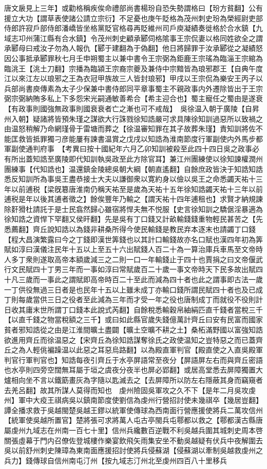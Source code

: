 唐文扆見上三年】或勸格稱疾俟命禮部尚書楊玢自恐失勢謂格曰【玢方貧翻】公有援立大功【謂草表使諸公請立宗衍】不足憂也庚午貶格為茂州刺史玢為榮經尉吏部侍郎許寂戶部侍郎潘嶠皆坐格黨貶官格尋再貶維州司戶庾凝績奏徙格於合水鎮【九域志卭州蒲江縣有合水鎮】令茂州刺史顧承郾伺格隂事王宗侃妻以格同姓欲全之謂承郾母曰戒汝子勿為人報仇【郾于建翻為于偽翻】他日將歸罪于汝承郾從之凝績怒因公事抵承郾罪秋七月壬申朔蜀主以兼中書令王宗弼為鉅鹿王宗瑤為臨淄王宗綰為臨洮王【洮土刀翻】宗播為臨潁王宗裔宗夔及兼侍中宗黯皆為琅邪郡王【自典午度江以來江左以琅邪之王為衣冠甲族故三人皆封琅邪】甲戌以王宗侃為樂安王丙子以兵部尚書庾傳素為太子少保兼中書侍郎同平章事蜀主不親政事内外遷除皆出于王宗弼宗弼納賄多私上下多怨宋光嗣通敏善希合【希主迎合也】蜀主寵任之蜀由是遂衰【有政事則國強無政事則國衰衰者亡之漸也可不戒哉】　吳徐温入朝于廣陵【自昇州入朝】疑諸將皆預朱瑾之謀欲大行誅戮徐知誥嚴可求具陳徐知訓過惡所以致禍之由温怒稍解乃命網瑾骨于雷塘而葬之【徐温審知罪在其子故葬朱瑾】責知訓將佐不能匡救皆抵罪獨刁彦能屢有諫書温賞之戊戌以知誥為淮南節度行軍副使内外馬步都軍副使通判府事　【考異曰按十國紀年六月乙卯知訓被殺至此四十四日吳之政事必有所出蓋知誥至廣陵即代知訓執吳政至此方除官耳】兼江州團練使以徐知諫權潤州團練事【代知誥也】温還鎮金陵總吳朝大綱【朝直遙翻】自餘庶政皆決于知誥知誥悉反知訓所為事吳王盡恭接士大夫以謙御衆以寛約身以儉以吳王之命悉蠲天祐十三年以前逋税【梁旣簒唐淮南仍稱天祐至是歲為天祐十五年徐知誥蠲天祐十三年以前逋税是年以後其逋者徵之】餘俟豐年乃輸之【謂天祐十四年逋租也】求賢才納規諫除姧猾杜請託于是士民翕然歸心雖宿將悍夫無不悦服【史言徐知訓之驕倨淫暴適為徐知誥之資悍下罕翻又侯旰翻】先是吳有丁口錢又計畝輸錢錢重物輕民甚苦之【先悉薦翻】齊丘說知誥以為錢非耕桑所得今使民輸錢是教民弃本逐末也請蠲丁口錢【程大昌演繁露曰今之丁錢即漢世筭錢也以其計口輸錢故亦名口賦也漢四年初為筭賦如淳曰漢儀注民年十五以上至五十六出賦錢人百二十為一算治庫兵車馬至文帝時人多丁衆則遂取高帝本額歲減三之二則一口一年輸錢止于四十也賈捐之曰文帝偃武行文民賦四十丁男三年而一事如淳曰常賦歲百二十歲一事文帝時天下民多故出賦四十凡三歲而一事此之謂賦即高帝時百二十至此而減為四十者也此之謂事即古法一歲一丁供役無過三日者是也民年十五以上雖未成丁亦輸口錢所謂民賦四十者也及已成丁則每歲當供三日之役者至此減為三年而才受一年之役也唐制成丁而就役不役則計日收其庸末世所謂丁口錢本此說式芮翻】自餘稅悉輸穀帛紬絹匹直千錢者當稅三千【以直千錢之物當稅額之三千】或曰如此縣官歲失錢億萬計齊丘曰安有民富而國家貧者邪知誥從之由是江淮間曠土盡闢【曠土空曠不耕之土】桑柘滿野國以富強知誥欲進用齊丘而徐温惡之【宋齊丘為徐知誥謀奪徐氏之政使温知之豈特惡之而已蓋齊丘之為人輕佻褊躁温以此惡之耳惡烏路翻】以為殿直軍判官【殿直使之入直吳殿軍判官行軍判官也】知誥每夜引齊丘于水亭屏語常至夜分【屏語屏左右而與齊丘密語也水亭則四旁空闊無耳屬于垣之虞夜分夜半也屏必郢翻】或居高堂悉去屏障獨置大爐相向坐不言以鐵筯畫灰為字隨以匙滅去之【去屏障所以防左右隱蔽其身而竊窺者去羌呂翻】故其所謀人莫得而知也　虔州險固吳軍攻之久不下【是年二月吳攻虔州】軍中大疫王祺病吳以鎮南節度使劉信為虔州行營招討使未幾祺卒【幾居豈翻】譚全播求救于吳越閩楚吳越王鏐以統軍使傳球為西南面行營應援使將兵二萬攻信州【統軍使吳越所置官】楚將張可求將萬人屯古亭閩兵屯鄠都以救之【鄠都漢古縣唐屬虔州九域志在州南一百七十里】信州兵纔數百逆戰不利吳越兵圍其城刺史周本啓關張虛幕于門内召僚佐登城樓作樂宴飲飛矢雨集安坐不動吳越疑有伏兵中夜解圍去吳以前舒州刺史陳璋為東南面應援招討使將兵侵蘇湖【侵蘇湖以牽制吳越救虔州之兵力】錢傳球自信州南屯汀州【按九域志汀州北至虔州四百八十里移兵